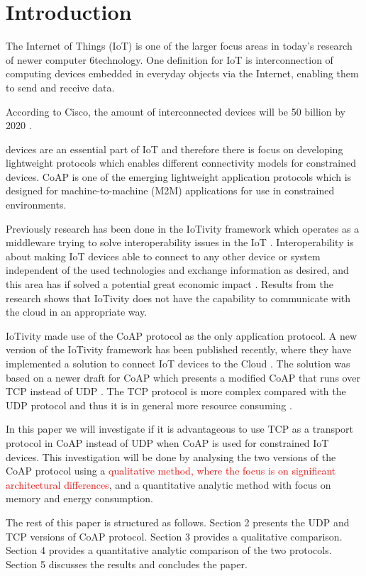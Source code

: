 \section{Introduction}
The Internet of Things (IoT) is one of the larger focus areas in today's research of newer computer 6technology. One definition for IoT is interconnection of computing devices embedded in everyday objects via the Internet, enabling them to send and receive data.

According to Cisco, the amount of interconnected devices will be 50 billion by 2020 \cite{cisco}.

 devices are an essential part of IoT and therefore there is focus on developing lightweight protocols which enables different connectivity models for constrained devices.  
CoAP is one of the emerging lightweight application protocols which is designed for machine-to-machine (M2M) applications for use in constrained environments.   

Previously research has been done in the IoTivity framework which operates as a middleware trying to solve interoperability issues in the IoT \cite{interoperabilityChallenge}. Interoperability is about making IoT devices able to connect to any other device or system independent of the used technologies and exchange information as desired, and this area has if solved a potential great economic impact \cite{McKinsey}. 
Results from the research shows that IoTivity does not have the capability to communicate with the cloud in an appropriate way. 

IoTivity made use of the CoAP protocol as the only application protocol. 
A new version of the IoTivity framework has been published recently, where they have implemented a solution to connect IoT devices to the Cloud \cite{iotivity1.1}. The solution was based on a newer draft for CoAP \cite{ietf-core-coap-tcp-tls-02} which presents a modified CoAP that runs over TCP instead of UDP \cite{coapUDP}.
The TCP protocol is more complex compared with the UDP protocol and thus it is in general more resource consuming \cite{giannoulis2009tcp}.


In this paper we will investigate if it is advantageous to use TCP as a transport protocol in CoAP instead of UDP when CoAP is used for constrained IoT devices. This investigation will be done by analysing the two versions of the CoAP protocol using a \textcolor{red}{qualitative method, where the focus is on significant architectural differences}, and a quantitative analytic method with focus on memory and energy consumption. 

The rest of this paper is structured as follows.  Section 2 presents the UDP and TCP versions of CoAP protocol. Section 3 provides a qualitative comparison. Section 4 provides a quantitative analytic comparison of the two protocols. Section 5 discusses the results and concludes the paper.     
